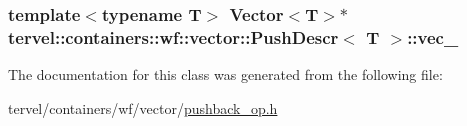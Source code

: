 \subsubsection[{vec\+\_\+}]{\setlength{\rightskip}{0pt plus 5cm}template$<$typename T$>$ Vector$<$T$>$$\ast$ {\bf tervel\+::containers\+::wf\+::vector\+::\+Push\+Descr}$<$ T $>$\+::vec\+\_\+\hspace{0.3cm}{\ttfamily [private]}}\label{classtervel_1_1containers_1_1wf_1_1vector_1_1_push_descr_a4435889c7578aac40dd4355523b52238}


The documentation for this class was generated from the following file\+:\begin{DoxyCompactItemize}
\item 
tervel/containers/wf/vector/\hyperlink{pushback__op_8h}{pushback\+\_\+op.\+h}\end{DoxyCompactItemize}
